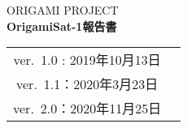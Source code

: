 \begin{titlepage}

\vspace*{10pt} 

\begin{center}

\Large{ORIGAMI PROJECT} \\
\vspace*{210pt}
\huge{\bf OrigamiSat-1報告書} \\ 
\vspace*{130pt}

\end{center}

\vspace*{80pt}

\begin{center}

\Large{
	\begin{tabular}{cc}
		ver.~1.0 : 2019年10月13日\\
		ver.~1.1：2020年3月23日\\
		ver.~2.0：2020年11月25日
	\end{tabular}
}

\vspace{20pt}


\end{center}

\end{titlepage}
